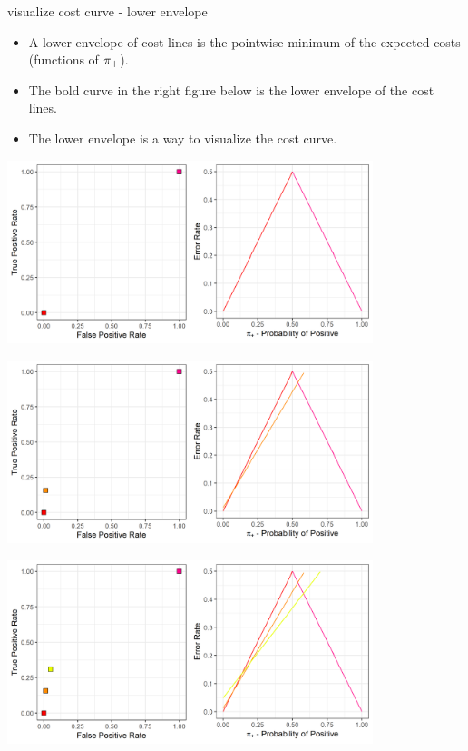\begin{frame}{visualize cost curve - lower envelope}
	
	\begin{itemize}
		\item A lower envelope of cost lines is the pointwise minimum of the expected costs (functions of $\pi_{+}$).
		\item The bold curve in the right figure below is the lower envelope of the cost lines.
		\item The lower envelope is a way to visualize the cost curve.
	\end{itemize}
   {
    \begin{center}
      \includegraphics[width=0.8\textwidth]{figure/lower_envelope_1.png}
    \end{center}  
  }
   {
    \begin{center}
      \includegraphics[width=0.8\textwidth]{figure/lower_envelope_2.png}
    \end{center}  
  }
   {
    \begin{center}
      \includegraphics[width=0.8\textwidth]{figure/lower_envelope_3.png}

\end{center}}
\end{frame}
